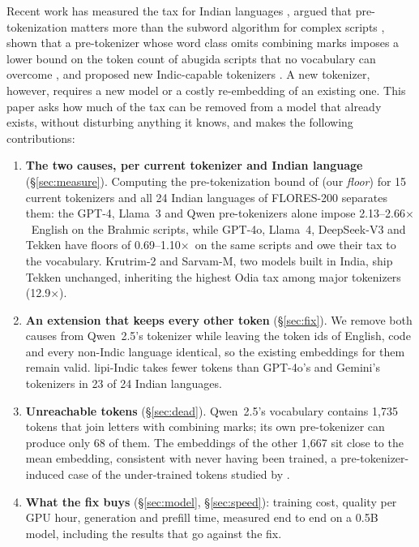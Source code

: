 \documentclass[11pt]{article}
\newcommand{\x}{$\times$}
\begin{document}
Recent work has measured the tax for Indian languages \citep{srivastava2026tokenizertax}, argued
that pre-tokenization matters more than the subword algorithm for complex scripts
\citep{velayuthan2025egalitarian}, shown that a pre-tokenizer whose word class omits combining marks
imposes a lower bound on the token count of abugida scripts that no vocabulary can overcome
\citep{regmi2026vowel}, and proposed new Indic-capable tokenizers
\citep{shravan2026brahmic,rana2025mutant}. A new tokenizer, however, requires a new model or a costly
re-embedding of an existing one. This paper asks how much of the tax can be removed from a model that
already exists, without disturbing anything it knows, and makes the following contributions:

\begin{enumerate}
\item \textbf{The two causes, per current tokenizer and Indian language} (\S\ref{sec:measure}).
Computing the pre-tokenization bound of \citet{regmi2026vowel} (our \emph{floor}) for 15 current
tokenizers and all 24 Indian languages of FLORES-200 separates them: the GPT-4, Llama~3 and Qwen
pre-tokenizers alone impose 2.13--2.66\x\ English on the Brahmic scripts, while GPT-4o, Llama~4,
DeepSeek-V3 and Tekken have floors of 0.69--1.10\x\ on the same scripts and owe their tax to the
vocabulary. Krutrim-2
and Sarvam-M, two models built in India, ship Tekken unchanged, inheriting the highest Odia tax among
major tokenizers (12.9\x).
\item \textbf{An extension that keeps every other token} (\S\ref{sec:fix}). We remove both causes from
Qwen~2.5's tokenizer while leaving the token ids of English, code and every non-Indic language
identical, so the existing embeddings for them remain valid. lipi-Indic takes fewer tokens than
GPT-4o's and Gemini's tokenizers in 23 of 24 Indian languages.
\item \textbf{Unreachable tokens} (\S\ref{sec:dead}). Qwen~2.5's vocabulary contains 1,735 tokens
that join letters with combining marks; its own pre-tokenizer can produce only 68 of them. The
embeddings of the other 1,667 sit close to the mean embedding, consistent with never having been
trained, a pre-tokenizer-induced case of the under-trained tokens studied by
\citet{land2024magikarp}.
\item \textbf{What the fix buys} (\S\ref{sec:model}, \S\ref{sec:speed}): training cost, quality per
GPU hour, generation and prefill time, measured end to end on a 0.5B model, including the results
that go against the fix.
\end{enumerate}
\end{document}
